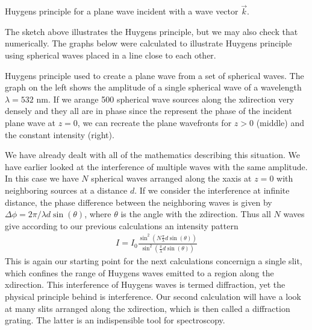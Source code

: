 \documentclass[letterpaper,10pt,english]{sphinxmanual}
\begin{document}



 Huygens principle for a plane wave incident with a wave vector \(\vec{k}\).





The sketch above illustrates the Huygens principle, but we may also check that numerically. The graphs below were calculated to illustrate Huygens principle using spherical waves placed in a line close to each other.






 Huygens principle used to create a plane wave from a set of spherical waves. The graph on the left shows the amplitude of a single spherical wave of a wavelength \(\lambda=532\) nm. If we arange 500 spherical wave sources along the x\sphinxhyphen{}direction very densely and they all are in phase since the represent the phase of the incident plane wave at \(z=0\), we can recreate the plane wavefronts for \(z>0\) (middle) and the constant intensity (right).





We have already dealt with all of the mathematics describing this situation. We have earlier looked at the interference of multiple waves with the same amplitude. In this case we have \(N\) spherical waves arranged along the x\sphinxhyphen{}axis at \(z=0\) with neighboring sources at a distance \(d\). If we consider the interference at infinite distance, the phase difference between the neighboring waves is given by \(\Delta \phi=2\pi/\lambda d\sin(\theta)\), where \(\theta\) is the angle
with the z\sphinxhyphen{}direction. Thus all \(N\) waves give according to our previous calculations an intensity pattern
\begin{equation*}
\begin{split}I=I_0 \frac{\sin^2\left (N\frac{\pi}{\lambda}d\sin(\theta)\right)}{\sin^2\left (\frac{\pi}{\lambda}d\sin(\theta)\right)}\end{split}
\end{equation*}
This is again our starting point for the next calculations concernign a single slit, which confines the range of Huygens waves emitted to a region along the x\sphinxhyphen{}direction. This interference of Huygens waves is termed diffraction, yet the physical principle behind is interference. Our second calculation will have a look at many slits arranged along the x\sphinxhyphen{}direction, which is then called a diffraction grating. The latter is an indispensible tool for spectroscopy.
\end{document}
